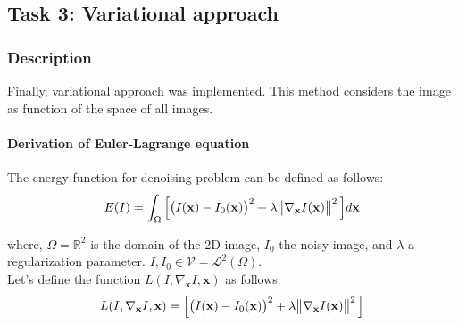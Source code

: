 \documentclass[paper=a4, fontsize=11pt]{scrartcl} %
\numberwithin{equation}{section} %
\numberwithin{figure}{section} %
\numberwithin{table}{section} %
\renewcommand{\vec}[1]{\mathbf{#1}}
\begin{document}

\subsection{Task 3: Variational approach}

\subsubsection{Description}

Finally, variational approach was implemented. This method considers the image as function of the space of all images. 

\paragraph{Derivation of Euler-Lagrange equation}

The energy function for denoising problem can be defined as follows:
\begin{align}
	E(I) = \int_{\Omega}\Big[\big(I(\vec{x}) - I_0(\vec{x})\big)^2 + \lambda \norm{\nabla_{\vec{x}} I(\vec{x})}^2 \Big]	d\vec{x}
\end{align}

where, $\Omega = \mathbb{R}^2$ is the domain of the 2D image, $I_0$ the noisy image, and $\lambda$ a regularization parameter. $I, I_0 \in \mathcal{V} = \mathcal{L}^2(\Omega)$. \\

Let's define the function $L(I, \nabla_{\vec{x}} I, \vec{x})$ as follows: 
\begin{align}
	L(I, \nabla_{\vec{x}} I, \vec{x}) = \Big[\big(I(\vec{x}) - I_0(\vec{x})\big)^2 + \lambda \norm{\nabla_{\vec{x}} I(\vec{x})}^2 \Big] \label{eq:energy}
\end{align}
\end{document}
